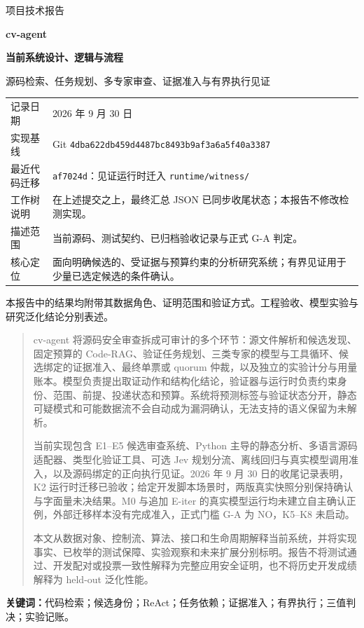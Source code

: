 \documentclass[UTF8,a4paper,zihao=-4,fontset=none]{ctexart}
\newcommand{\code}[1]{{\small\nolinkurl{#1}}}
\begin{document}
\begin{titlepage}
\vspace*{22mm}
{\sffamily\color{accent}\large 项目技术报告\par}
\vspace{10mm}
{\sffamily\bfseries\color{ink}\Huge cv-agent\par}
\vspace{6mm}
{\sffamily\bfseries\LARGE 当前系统设计、逻辑与流程\par}
\vspace{8mm}
{\large 源码检索、任务规划、多专家审查、证据准入与有界执行见证\par}
\vspace{18mm}
\noindent\begin{tabularx}{\textwidth}{L{31mm}Y}
\toprule
记录日期 & 2026 年 9 月 30 日\tabularnewline
实现基线 & Git \code{4dba622db459d4487bc8493b9af3a6a5f40a3387}\tabularnewline
最近代码迁移 & \code{af7024d}：见证运行时迁入 \code{runtime/witness/}\tabularnewline
工作树说明 & 在上述提交之上，最终汇总 JSON 已同步收尾状态；本报告不修改检测实现。\tabularnewline
描述范围 & 当前源码、测试契约、已归档验收记录与正式 G-A 判定。\tabularnewline
核心定位 & 面向明确候选的、受证据与预算约束的分析研究系统；有界见证用于少量已选定候选的条件确认。\tabularnewline
\bottomrule
\end{tabularx}
\vfill
{\small 本报告中的结果均附带其数据角色、证明范围和验证方式。工程验收、模型实验与研究泛化结论分别表述。\par}
\end{titlepage}

\begin{abstract}
cv-agent 将源码安全审查拆成可审计的多个环节：源文件解析和候选发现、固定预算的 Code-RAG、验证任务规划、三类专家的模型与工具循环、候选绑定的证据准入、最终单票或 quorum 仲裁，以及独立的实验计分与用量账本。模型负责提出取证动作和结构化结论，验证器与运行时负责约束身份、范围、前提、投递状态和预算。系统将预测标签与验证状态分开，静态可疑模式和可能数据流不会自动成为漏洞确认，无法支持的语义保留为未解析。

当前实现包含 E1--E5 候选审查系统、Python 主导的静态分析、多语言源码适配器、类型化验证工具、可选 Jev 规划分流、离线回归与真实模型调用准入，以及源码绑定的正向执行见证。2026 年 9 月 30 日的收尾记录表明，K2 运行时迁移已验收；给定开发脚本场景时，两版真实快照分别保持确认与字面量未决结果。M0 与追加 E-iter 的真实模型运行均未建立自主确认正例，外部迁移样本没有完成准入，正式门槛 G-A 为 NO，K5--K8 未启动。

本文从数据对象、控制流、算法、接口和生命周期解释当前系统，并将实现事实、已枚举的测试保障、实验观察和未来扩展分别标明。报告不将测试通过、开发配对或投票一致性解释为完整应用安全证明，也不将历史开发成绩解释为 held-out 泛化性能。
\end{abstract}
\noindent\textbf{关键词：}代码检索；候选身份；ReAct；任务依赖；证据准入；有界执行；三值判决；实验记账。
\clearpage
\tableofcontents
\clearpage
{}
\end{document}

